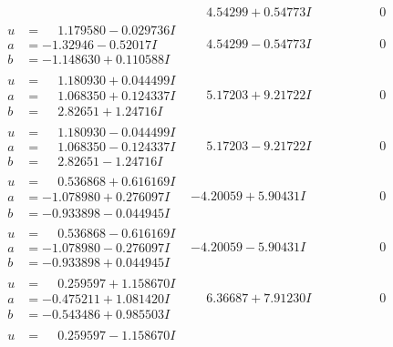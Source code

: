 \documentclass[1p]{elsarticle_modified}
\theoremstyle{definition}
\begin{document}
$$\begin{array}{c|c|c}
 & \phantom{-}4.54299 + 0.54773 I & \phantom{-0.000000 } 0 \\ \hline\begin{aligned}
u &= \phantom{-}1.179580 - 0.029736 I \\
a &= -1.32946 - 0.52017 I \\
b &= -1.148630 + 0.110588 I\end{aligned}
 & \phantom{-}4.54299 - 0.54773 I & \phantom{-0.000000 } 0 \\ \hline\begin{aligned}
u &= \phantom{-}1.180930 + 0.044499 I \\
a &= \phantom{-}1.068350 + 0.124337 I \\
b &= \phantom{-}2.82651 + 1.24716 I\end{aligned}
 & \phantom{-}5.17203 + 9.21722 I & \phantom{-0.000000 } 0 \\ \hline\begin{aligned}
u &= \phantom{-}1.180930 - 0.044499 I \\
a &= \phantom{-}1.068350 - 0.124337 I \\
b &= \phantom{-}2.82651 - 1.24716 I\end{aligned}
 & \phantom{-}5.17203 - 9.21722 I & \phantom{-0.000000 } 0 \\ \hline\begin{aligned}
u &= \phantom{-}0.536868 + 0.616169 I \\
a &= -1.078980 + 0.276097 I \\
b &= -0.933898 - 0.044945 I\end{aligned}
 & -4.20059 + 5.90431 I & \phantom{-0.000000 } 0 \\ \hline\begin{aligned}
u &= \phantom{-}0.536868 - 0.616169 I \\
a &= -1.078980 - 0.276097 I \\
b &= -0.933898 + 0.044945 I\end{aligned}
 & -4.20059 - 5.90431 I & \phantom{-0.000000 } 0 \\ \hline\begin{aligned}
u &= \phantom{-}0.259597 + 1.158670 I \\
a &= -0.475211 + 1.081420 I \\
b &= -0.543486 + 0.985503 I\end{aligned}
 & \phantom{-}6.36687 + 7.91230 I & \phantom{-0.000000 } 0 \\ \hline\begin{aligned}
u &= \phantom{-}0.259597 - 1.158670 I \\

\end{aligned}
\end{array}$$
\end{document}
